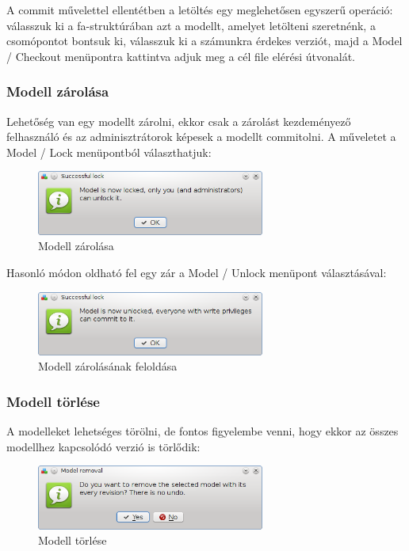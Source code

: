 \documentclass[a4paper,12pt]{article}
\begin{document}
A commit művelettel ellentétben a letöltés egy meglehetősen egyszerű operáció:
válasszuk ki a fa-struktúrában azt a modellt, amelyet letölteni szeretnénk, a
csomópontot bontsuk ki, válasszuk ki a számunkra érdekes verziót, majd a Model
/ Checkout menüpontra kattintva adjuk meg a cél file elérési útvonalát.

\subsubsection{Modell zárolása}

Lehetőség van egy modellt zárolni, ekkor csak a zárolást kezdeményező
felhasználó és az adminisztrátorok képesek a modellt commitolni. A műveletet a
Model / Lock menüpontból választhatjuk:

\begin{figure}[H]
\centering
\includegraphics[width=75mm,keepaspectratio]{model-lock.png}
\caption{Modell zárolása}
\end{figure}

Hasonló módon oldható fel egy zár a Model / Unlock menüpont választásával:

\begin{figure}[H]
\centering
\includegraphics[width=75mm,keepaspectratio]{model-unlock.png}
\caption{Modell zárolásának feloldása}
\end{figure}

\subsubsection{Modell törlése}

A modelleket lehetséges törölni, de fontos figyelembe venni, hogy ekkor az
összes modellhez kapcsolódó verzió is törlődik:

\begin{figure}[H]
\centering
\includegraphics[width=75mm,keepaspectratio]{model-delete.png}
\caption{Modell törlése}
\end{figure}
\end{document}
